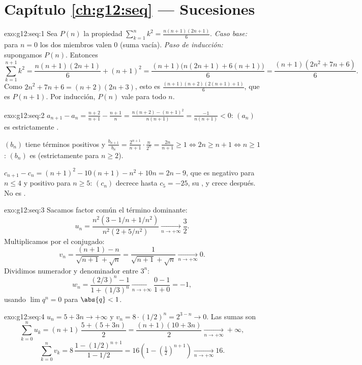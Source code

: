 \section*{Capítulo \ref{ch:g12:seq} --- Sucesiones}

\begin{solution}{exo:g12:seq:1}
Sea $P(n)$ la propiedad $\sum_{k=1}^{n} k^2 = \frac{n(n+1)(2n+1)}{6}$.
\emph{Caso base:} para $n = 0$ los dos miembros valen $0$ (suma vacía).
\emph{Paso de inducción:} supongamos $P(n)$. Entonces
\[
\sum_{k=1}^{n+1} k^2 = \frac{n(n+1)(2n+1)}{6} + (n+1)^2
= \frac{(n+1)\bigl(n(2n+1) + 6(n+1)\bigr)}{6}
= \frac{(n+1)(2n^2 + 7n + 6)}{6}.
\]
Como $2n^2 + 7n + 6 = (n+2)(2n+3)$, esto es
$\frac{(n+1)(n+2)(2(n+1)+1)}{6}$, que es $P(n+1)$. Por inducción, $P(n)$
vale para todo $n$.
\end{solution}

\begin{solution}{exo:g12:seq:2}
$a_{n+1} - a_n = \frac{n+2}{n+1} - \frac{n+1}{n}
= \frac{n(n+2) - (n+1)^2}{n(n+1)} = \frac{-1}{n(n+1)} < 0$: $(a_n)$ es
estrictamente .

$(b_n)$ tiene términos positivos y
$\frac{b_{n+1}}{b_n} = \frac{2^{n+1}}{n+1}\cdot\frac{n}{2^n} =
\frac{2n}{n+1} \geq 1 \iff 2n \geq n+1 \iff n \geq 1$: $(b_n)$ es 
(estrictamente para $n \geq 2$).

$c_{n+1} - c_n = (n+1)^2 - 10(n+1) - n^2 + 10n = 2n - 9$, que es negativo
para $n \leq 4$ y positivo para $n \geq 5$: $(c_n)$ decrece hasta
$c_5 = -25$, su , y crece después. No es .
\end{solution}

\begin{solution}{exo:g12:seq:3}
Sacamos factor común el término dominante:
\[
u_n = \frac{n^2(3 - 1/n + 1/n^2)}{n^2(2 + 5/n^2)} \xrightarrow[n\to+\infty]{} \frac{3}{2}.
\]
Multiplicamos por el conjugado:
\[
v_n = \frac{(n+1) - n}{\sqrt{n+1} + \sqrt{n}} = \frac{1}{\sqrt{n+1}+\sqrt{n}}
\xrightarrow[n\to+\infty]{} 0.
\]
Dividimos numerador y denominador entre $3^n$:
\[
w_n = \frac{(2/3)^n - 1}{1 + (1/3)^n} \xrightarrow[n\to+\infty]{} \frac{0-1}{1+0} = -1,
\]
usando $\lim q^n = 0$ para $\abs{q} < 1$.
\end{solution}

\begin{solution}{exo:g12:seq:4}
$u_n = 5 + 3n \to +\infty$ y $v_n = 8 \cdot (1/2)^n = 2^{3-n} \to 0$. Las
sumas son
\[
\sum_{k=0}^{n} u_k = (n+1)\,\frac{5 + (5+3n)}{2} = \frac{(n+1)(10+3n)}{2}
\xrightarrow[n\to+\infty]{} +\infty,
\]
\[
\sum_{k=0}^{n} v_k = 8\,\frac{1 - (1/2)^{n+1}}{1 - 1/2}
= 16\left(1 - \left(\tfrac{1}{2}\right)^{n+1}\right)
\xrightarrow[n\to+\infty]{} 16 .
\]
\end{solution}

